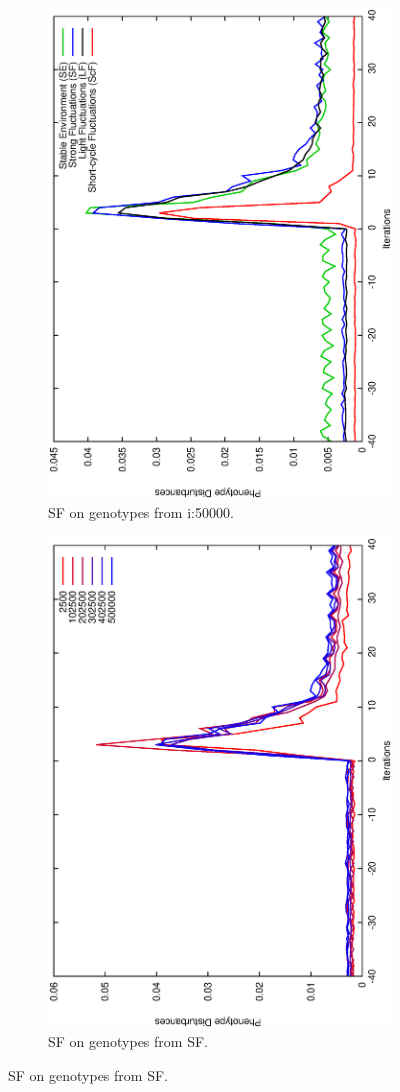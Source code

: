 \begin{figure}[H]
\begin{subfigure}{.25\textwidth}
  \centering
  \includegraphics[width=.7\linewidth, angle =-90]{img/Sucavg499999variationb.eps}
  \caption{SF on genotypes from i:50000.}
  \label{fig:transst}
\end{subfigure}%
\begin{subfigure}{.25\textwidth}
  \centering
  \includegraphics[width=.7\linewidth, angle =-90]{img/SucavgvarValidvariationb.eps}
  \caption{SF on genotypes from SF.}
  \label{fig:transli}
\end{subfigure}


\end{figure}

